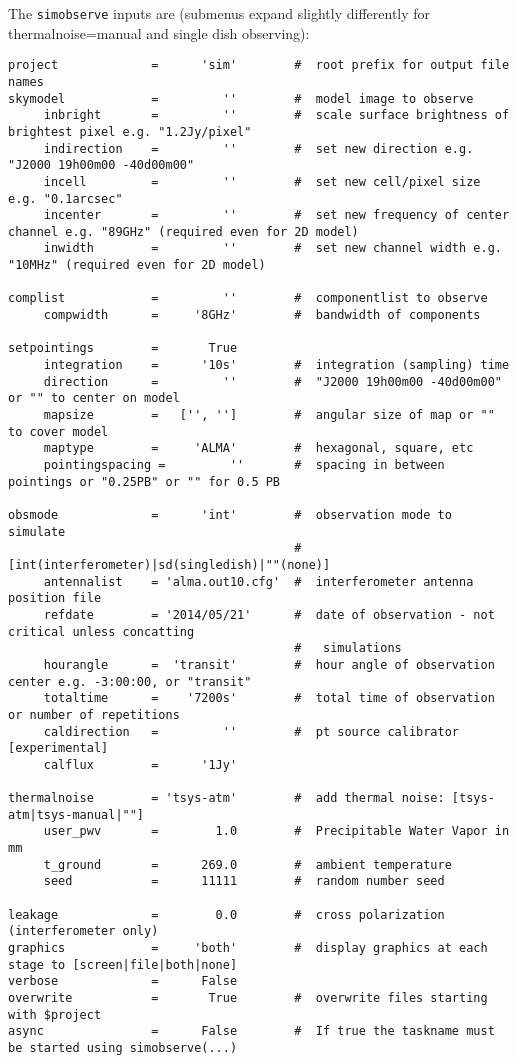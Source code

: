 The {\tt simobserve} inputs are (submenus expand slightly differently for thermalnoise=manual and single dish observing):
\small
\begin{verbatim}
project             =      'sim'        #  root prefix for output file names
skymodel            =         ''        #  model image to observe
     inbright       =         ''        #  scale surface brightness of brightest pixel e.g. "1.2Jy/pixel"
     indirection    =         ''        #  set new direction e.g. "J2000 19h00m00 -40d00m00"
     incell         =         ''        #  set new cell/pixel size e.g. "0.1arcsec"
     incenter       =         ''        #  set new frequency of center channel e.g. "89GHz" (required even for 2D model)
     inwidth        =         ''        #  set new channel width e.g. "10MHz" (required even for 2D model)

complist            =         ''        #  componentlist to observe
     compwidth      =     '8GHz'        #  bandwidth of components

setpointings        =       True        
     integration    =      '10s'        #  integration (sampling) time
     direction      =         ''        #  "J2000 19h00m00 -40d00m00" or "" to center on model
     mapsize        =   ['', '']        #  angular size of map or "" to cover model
     maptype        =     'ALMA'        #  hexagonal, square, etc
     pointingspacing =         ''       #  spacing in between pointings or "0.25PB" or "" for 0.5 PB

obsmode             =      'int'        #  observation mode to simulate
                                        #   [int(interferometer)|sd(singledish)|""(none)]
     antennalist    = 'alma.out10.cfg'  #  interferometer antenna position file
     refdate        = '2014/05/21'      #  date of observation - not critical unless concatting
                                        #   simulations
     hourangle      =  'transit'        #  hour angle of observation center e.g. -3:00:00, or "transit"
     totaltime      =    '7200s'        #  total time of observation or number of repetitions
     caldirection   =         ''        #  pt source calibrator [experimental]
     calflux        =      '1Jy'        

thermalnoise        = 'tsys-atm'        #  add thermal noise: [tsys-atm|tsys-manual|""]
     user_pwv       =        1.0        #  Precipitable Water Vapor in mm
     t_ground       =      269.0        #  ambient temperature
     seed           =      11111        #  random number seed

leakage             =        0.0        #  cross polarization (interferometer only)
graphics            =     'both'        #  display graphics at each stage to [screen|file|both|none]
verbose             =      False        
overwrite           =       True        #  overwrite files starting with $project
async               =      False        #  If true the taskname must be started using simobserve(...)
\end{verbatim}
\normalsize

